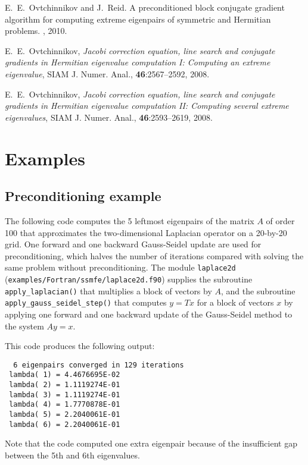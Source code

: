 E.~E.~Ovtchinnikov and J.~Reid.
A preconditioned block conjugate gradient
algorithm for computing extreme eigenpairs
of symmetric and Hermitian problems.
\report, 2010.

E.~E.~Ovtchinnikov,
{\em Jacobi correction equation, line search and
conjugate gradients in Hermitian eigenvalue computation I:
Computing an extreme eigenvalue},
SIAM J. Numer. Anal., {\bf 46}:2567--2592, 2008.

E.~E.~Ovtchinnikov,
{\em Jacobi correction equation, line search and
conjugate gradients in Hermitian eigenvalue computation II:
Computing several extreme eigenvalues},
SIAM J. Numer. Anal., {\bf 46}:2593--2619, 2008.

\section{Examples}

\subsection{Preconditioning example}
\label{sec:ex.prec}

The following code 
computes the 5 leftmost eigenpairs of 
the matrix $A$ of order 100 that approximates 
the two-dimensional Laplacian operator
on a 20-by-20 grid.
One forward and one backward Gauss-Seidel update
are used for preconditioning,
which halves the number of iterations
compared with solving the same problem without preconditioning.
The module {\tt laplace2d} (\texttt{examples/Fortran/ssmfe/laplace2d.f90})
supplies the subroutine {\tt apply\_laplacian()}
that multiplies a block of vectors by $A$,
and the subroutine 
{\tt apply\_gauss\_seidel\_step()}
that computes $y = T x$ for a block of vectors $x$
by applying one forward and one backward update
of the Gauss-Seidel method to the system $A y = x$.

This code produces the following output:
\begin{verbatim}
  6 eigenpairs converged in 129 iterations
 lambda( 1) = 4.4676695E-02
 lambda( 2) = 1.1119274E-01
 lambda( 3) = 1.1119274E-01
 lambda( 4) = 1.7770878E-01
 lambda( 5) = 2.2040061E-01
 lambda( 6) = 2.2040061E-01
\end{verbatim}

Note that the code computed one extra eigenpair
because of the insufficient gap between the 5th and 6th
eigenvalues.
